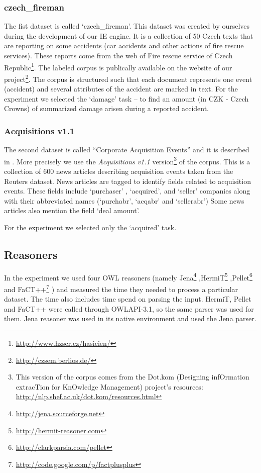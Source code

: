 \documentclass[10pt, conference, compsocconf]{IEEEtran}
\begin{document}
\subsubsection{czech\_fireman}


The fist dataset is called `czech\_fireman'. This dataset was created by ourselves during the development of our IE  engine. It is a collection of 50 Czech texts that are reporting on some accidents (car accidents and other actions of fire rescue services). These reports come from the web of Fire rescue service of Czech Republic\footnote{\url{http://www.hzscr.cz/hasicien/}}. The labeled corpus is publically available on the website of our project\footnote{\url{http://czsem.berlios.de/}}.
The corpus is structured such that each document represents one event (accident) and several attributes of the accident are marked in text. For the experiment we selected the `damage' task -- to find an amount (in CZK - Czech Crowns) of summarized damage arisen during a reported accident.





\subsubsection{Acquisitions v1.1}  

The second dataset is called ``Corporate Acquisition Events'' and it is
described in \cite{lewis1992representation}. More precisely we use the \emph{Acquisitions v1.1} version\footnote{This version of the corpus comes from the Dot.kom (Designing infOrmation extracTion for KnOwledge Management) project's resources: \url{http://nlp.shef.ac.uk/dot.kom/resources.html}} of the corpus.
This is a collection of 600 news articles describing acquisition
events taken from the Reuters dataset. News articles are tagged to identify fields
related to acquisition events. These fields include `purchaser' , `acquired', and
`seller' companies along with their abbreviated names (`purchabr', `acqabr' and
`sellerabr') Some news articles also mention the field `deal amount'.


For the experiment we selected only the `acquired' task.





\subsection{Reasoners}

In the experiment we used four OWL reasoners (namely
Jena\footnote{\url{http://jena.sourceforge.net}}
,HermiT\footnote{\url{http://hermit-reasoner.com}}
,Pellet\footnote{\url{http://clarkparsia.com/pellet}}
and FaCT++\footnote{\url{http://code.google.com/p/factplusplus}}
) and measured the time they needed to process a particular dataset. The time also includes time spend on parsing the input. HermiT, Pellet and FaCT++ were called through OWLAPI-3.1, so the same parser was used for them. Jena reasoner was used in its native environment and used the Jena parser.
\end{document}
